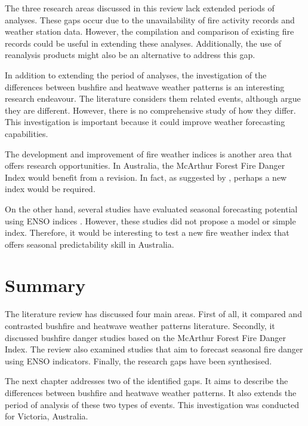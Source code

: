 The three research areas discussed in this review lack extended periods
of analyses. These gaps occur due to the unavailability of fire activity
records and weather station data. However, the compilation and comparison
of existing fire records could be useful in extending these analyses.
Additionally, the use of reanalysis products might also be an alternative
to address this gap.

In addition to extending the period of analyses, the investigation
of the differences between bushfire and heatwave weather patterns
is an interesting research endeavour. The literature considers them
related events, although \citet{Reeder2015} argue they are different.
However, there is no comprehensive study of how they differ. This
investigation is important because it could improve weather forecasting
capabilities.

The development and improvement of fire weather indices is another
area that offers research opportunities. In Australia, the McArthur
Forest Fire Danger Index would benefit from a revision. In fact, as
suggested by \citet{Teague2010}, perhaps a new index would be required. 

On the other hand, several studies have evaluated seasonal forecasting
potential using ENSO indices \citep{Nicholls2007,Harris2013}. However,
these studies did not propose a model or simple index. Therefore,
it would be interesting to test a new fire weather index that offers
seasonal predictability skill in Australia. 


\section{Summary}

The literature review has discussed four main areas. First of all,
it compared and contrasted bushfire and heatwave weather patterns
literature. Secondly, it discussed bushfire danger studies based on
the McArthur Forest Fire Danger Index. The review also examined studies
that aim to forecast seasonal fire danger using ENSO indicators. Finally,
the research gaps have been synthesised.

The next chapter addresses two of the identified gaps. It aims to
describe the differences between bushfire and heatwave weather patterns.
It also extends the period of analysis of these two types of events.
This investigation was conducted for Victoria, Australia.
